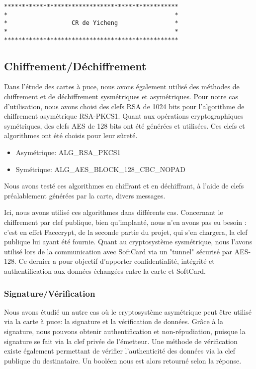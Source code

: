 \documentclass[a4paper,11pt,french]{article}
\begin{document}
\begin{verbatim}
*************************************************
*                                               *
*                  CR de Yicheng                *
*                                               *
*************************************************
\end{verbatim}


\subsection{Chiffrement/Déchiffrement}
Dans l'étude des cartes à puce, nous avons également utilisé des méthodes de 
chiffrement et de déchiffrement sysmétriques et asymétriques. Pour notre cas 
d'utilisation, nous avons choisi des clefs RSA de 1024 bits pour l'algorithme de
chiffrement asymétrique RSA-PKCS1. Quant aux opérations cryptographiques 
symétriques, des clefs AES de 128 bits ont été générées et utilisées. Ces clefs
et algorithmes ont été choisis pour leur sûreté.


\begin{itemize}
	\item Asymétrique: ALG\_RSA\_PKCS1
	\item Symétrique: ALG\_AES\_BLOCK\_128\_CBC\_NOPAD 
\end{itemize}

Nous avons testé ces algorithmes en chiffrant et en déchiffrant, à l'aide de 
clefs préalablement générées par la carte, divers messages. 

Ici, nous avons utilisé ces algorithmes dans différents cas. Concernant
le chiffrement par clef publique, bien qu'implanté, nous n'en avons pas eu 
besoin : c'est en effet Facecrypt, de la seconde partie du projet, qui s'en 
chargera, la clef publique lui ayant été fournie. Quant au cryptosystème 
sysmétrique, nous l'avons utilisé lors de la communication avec SoftCard
via un "tunnel" sécurisé par AES-128. Ce dernier a pour objectif d'apporter 
confidentialité, intégrité et authentification aux données échangées entre la 
carte et SoftCard.

\subsubsection{Signature/Vérification}
Nous avons étudié un autre cas où le cryptosystème asymétrique peut être utilisé
via la carte à puce: la signature et la vérification de données. Grâce à la 
signature, nous pouvons obtenir authentification et non-répudiation, puisque la
signature se fait via la clef privée de l'émetteur. Une méthode de vérification
existe également permettant de vérifier l'authenticité des données via la clef 
publique du destinataire. Un booléen nous est alors retourné selon la réponse.
\end{document}
